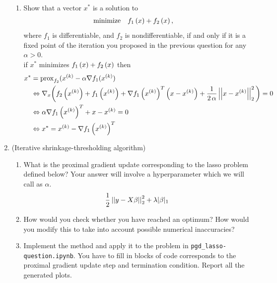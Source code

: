 \documentclass[12pt,twoside]{article}
\begin{document}
\begin{enumerate}
\begin{enumerate}
\item Show that a vector $x^{\ast}$ is a solution to
\begin{align}
 \operatorname{minimize} \quad & f_1\left( x \right) + f_2\left( x \right),
\end{align}
where $f_1$ is differentiable, and $f_2$ is nondifferentiable, if and only if it is a fixed point of the iteration you proposed in the previous question for any $\alpha > 0$.\\
if $x^{\ast}$ minimizes $f_1\left( x \right) + f_2\left( x \right)$  then
\begin{align*}
	x^{\ast} &= \operatorname{prox}_{f_2} (x^{(k)}  - \alpha \nabla f_1 (x^{(k)}) \\
	& \Leftrightarrow \nabla_x \bigg( f_2\left( x^{(k)} \right) + f_1\left( x^{(k)} \right) + \nabla f_1\left( x^{(k)} \right)^T\left( x-x^{(k)} \right) +  \frac{1}{2 \, \alpha }\left|\left| x-x^{(k)} \right|\right| _{2}^2 \bigg) = 0\\
	& \Leftrightarrow \alpha  \nabla f_1\left( x^{(k)} \right)^T + x - x^{(k)} = 0 \\
	& \Leftrightarrow  x^{\ast} =  x^{(k)}  - \nabla f_1\left( x^{(k)} \right)^T  \\
\end{align*}


  \end{enumerate}
  
  \newpage
  \item (Iterative shrinkage-thresholding algorithm)   
 \begin{enumerate}
 \item What is the proximal gradient update corresponding to the lasso problem defined below? Your answer will involve a hyperparameter which we will call as $\alpha$. 
 \begin{align*}
 \frac{1}{2} \left|\left| y - X\beta \right|\right| _{2}^2 + \lambda |\beta|_1
 \end{align*}
 \item How would you check whether you have reached an optimum? How would you modify this to take into account possible numerical inaccuracies?
 \item Implement the method and apply it to the problem in \texttt{pgd\_lasso-question.ipynb}. You have to fill in blocks of code corresponds to the proximal gradient update step and termination condition. Report all the generated plots.
 \end{enumerate}
 

 \end{enumerate}
\end{document}
